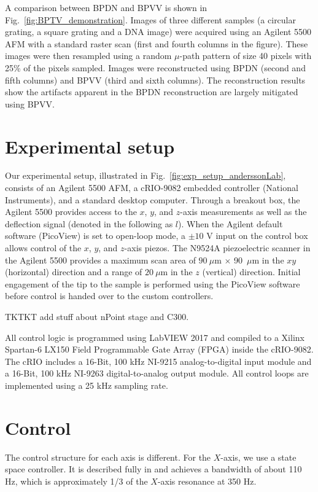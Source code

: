 \documentclass[twocolumn,twoside]{IEEEtran/IEEEtran}
\begin{document}
A comparison between BPDN and BPVV is shown in
Fig.~\ref{fig:BPTV_demonstration}. Images of three different samples (a circular
grating, a square grating and a DNA image) were acquired using an Agilent 5500
AFM with a standard raster scan (first and fourth columns in the figure). These
images were then resampled using a random $\mu$-path pattern of size 40 pixels
with 25\% of the pixels sampled. Images were reconstructed using BPDN (second
and fifth columns) and BPVV (third and sixth columns). The reconstruction
results show the artifacts apparent in the BPDN reconstruction are largely
mitigated using BPVV.
	

\section{Experimental setup} \label{sec:experimentalSetup}
Our experimental setup, illustrated in Fig.~\ref{fig:exp_setup_anderssonLab},
consists of an Agilent 5500 AFM, a cRIO-9082 embedded controller (National
Instruments), and a standard desktop computer. Through a breakout box, the
Agilent 5500 provides access to the $x$, $y$, and $z$-axis measurements as well
as the deflection signal (denoted in the following as $l$). When the Agilent
default software (PicoView) is set to open-loop mode, a $\pm 10$ V input on the
control box allows control of the $x$, $y$, and $z$-axis piezos. The N9524A
piezoelectric scanner in the Agilent 5500 provides a maximum scan area of
$90~\mu$m $\times$ 90~$\mu$m in the $xy$ (horizontal) direction and a range of
$20~\mu$m in the $z$ (vertical) direction. Initial engagement of the tip to the
sample is performed using the PicoView software before control is handed over to
the custom controllers.

TKTKT add stuff about nPoint stage and C300.
	
All control logic is programmed using LabVIEW 2017 and compiled to a Xilinx
Spartan-6 LX150 Field Programmable Gate Array (FPGA) inside the cRIO-9082. The
cRIO includes a 16-Bit, 100 kHz NI-9215 analog-to-digital input module and a
16-Bit, 100 kHz NI-9263 digital-to-analog output module. All control loops are
implemented using a 25 kHz sampling rate.

\section{Control}\label{sec:control}
The control structure for each axis is different. For the $X$-axis, we use a
state space controller. It is described fully in \cite{braker_afmmpc_2019} and
achieves a bandwidth of about 110 Hz, which is approximately 1/3 of the $X$-axis
resonance at 350 Hz.
\end{document}
